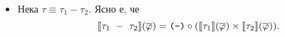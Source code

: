 \begin{hint}
\begin{itemize}
  \item
    Нека $\tau \equiv \tau_1 - \tau_2$.
    Ясно е, че
    \[\val{\tau_1\ -\ \tau_2}(\ov{\varphi}) = \minus \circ (\val{\tau_1}(\ov{\varphi}) \times \val{\tau_2}(\ov{\varphi})).\]


\end{itemize}
\end{hint}

